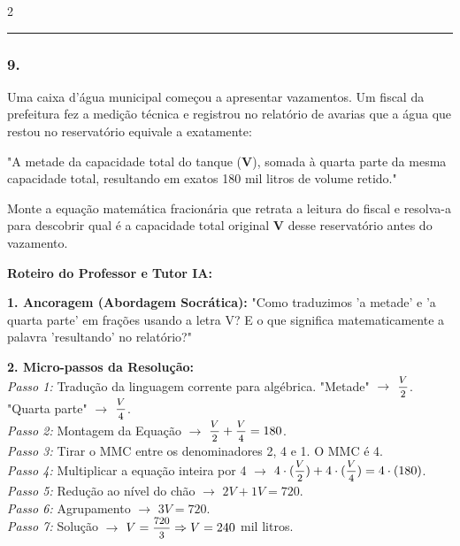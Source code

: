 \begin{multicols*}{2}
\par\vspace{\espacoQuestao}


\noindent\textcolor{CorLinha}{\rule{\linewidth}{0.5pt}} 
\par\vspace{\espacoPreQuestao}
\subsubsection*{9.} 
\begin{enunciadoLiteral}
Uma caixa d'água municipal começou a apresentar vazamentos. Um fiscal da prefeitura fez a medição técnica e registrou no relatório de avarias que a água que restou no reservatório equivale a exatamente:

"A metade da capacidade total do tanque (\textbf{V}), somada à quarta parte da mesma capacidade total, resultando em exatos 180 mil litros de volume retido."

Monte a equação matemática fracionária que retrata a leitura do fiscal e resolva-a para descobrir qual é a capacidade total original \textbf{V} desse reservatório antes do vazamento.
\end{enunciadoLiteral}

\ifgabarito
    \begin{tcolorbox}[colback=CorTitUm!5, colframe=CorTitUm, boxrule=1pt, arc=4pt, left=6pt, right=6pt, top=6pt, bottom=6pt]
    \small\textbf{\textcolor{CorTitUm}{Roteiro do Professor e Tutor IA:}}\par\vspace{0.1cm}
    \color{CinzaEscuro}
    \textbf{1. Ancoragem (Abordagem Socrática):} "Como traduzimos 'a metade' e 'a quarta parte' em frações usando a letra V? E o que significa matematicamente a palavra 'resultando' no relatório?"\par\vspace{0.1cm}
    
    \textbf{2. Micro-passos da Resolução:}\\
    \textit{Passo 1:} Tradução da linguagem corrente para algébrica. "Metade" $\rightarrow$ $\mfrac{V}{2}$. "Quarta parte" $\rightarrow$ $\mfrac{V}{4}$.\\
    \textit{Passo 2:} Montagem da Equação $\rightarrow$ $\mfrac{V}{2} + \mfrac{V}{4} = 180$.\\
    \textit{Passo 3:} Tirar o MMC entre os denominadores 2, 4 e 1. O MMC é 4.\\
    \textit{Passo 4:} Multiplicar a equação inteira por 4 $\rightarrow$ $4 \cdot (\mfrac{V}{2}) + 4 \cdot (\mfrac{V}{4}) = 4 \cdot (180)$.\\
    \textit{Passo 5:} Redução ao nível do chão $\rightarrow$ $2V + 1V = 720$.\\
    \textit{Passo 6:} Agrupamento $\rightarrow$ $3V = 720$.\\
    \textit{Passo 7:} Solução $\rightarrow$ $V = \mfrac{720}{3} \Rightarrow V = 240$ mil litros.\par\vspace{0.1cm}
    

\end{tcolorbox}
\end{multicols*}
